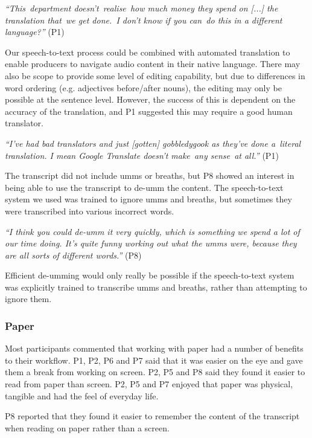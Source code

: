\textit{``This department doesn't realise how much money they spend on [...] the translation that we get done. I don't
know if you can do this in a different language?''} (P1)

Our speech-to-text process could be combined with automated translation to enable producers to navigate audio content
in their native language. There may also be scope to provide some level of editing capability, but due to differences
in word ordering (e.g. adjectives before/after nouns), the editing may only be possible at the sentence level. However,
the success of this is dependent on the accuracy of the translation, and P1 suggested this may require a good human
translator.

\textit{``I've had bad translators and just [gotten] gobbledygook as they've done a literal translation. I mean Google
Translate doesn't make any sense at all.''} (P1)


The transcript did not include umms or breaths, but P8 showed an interest in being able to use the transcript to de-umm
the content. The speech-to-text system we used was trained to ignore umms and breaths, but sometimes they were
transcribed into various incorrect words.

\textit{``I think you could de-umm it very quickly, which is something we spend a lot of our time doing.  It's quite
funny working out what the umms were, because they are all sorts of different words.''} (P8)

Efficient de-umming would only really be possible if the speech-to-text system was explicitly trained to transcribe
umms and breaths, rather than attempting to ignore them.

\subsubsection{Paper}


Most participants commented that working with paper had a number of benefits to their workflow. P1, P2, P6 and P7 said
that it was easier on the eye and gave them a break from working on screen. P2, P5 and P8 said they found it easier to
read from paper than screen. P2, P5 and P7 enjoyed that paper was physical, tangible and had the feel of everyday life.

P8 reported that they found it easier to remember the content of the transcript when reading on paper rather than a
screen.


